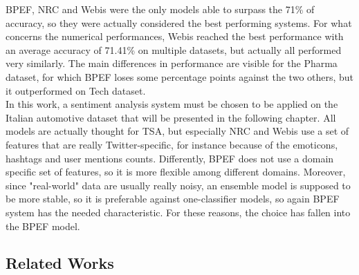 BPEF, NRC and Webis were the only models able to surpass the 71\% of accuracy, so they were actually considered the best performing systems. For what concerns the numerical performances, Webis reached the best performance with an average accuracy of 71.41\% on multiple datasets, but actually all performed very similarly. The main differences in performance are visible for the Pharma dataset, for which BPEF loses some percentage points against the two others, but it outperformed on Tech dataset.\\
In this work, a sentiment analysis system must be chosen to be applied on the Italian automotive dataset that will be presented in the following chapter. All models are actually thought for \ac{TSA}, but especially NRC and Webis use a set of features that are really Twitter-specific, for instance because of the emoticons, hashtags and user mentions counts. Differently, BPEF does not use a domain specific set of features, so it is more flexible among different domains. Moreover, since "real-world" data are usually really noisy, an ensemble model is supposed to be more stable, so it is preferable against one-classifier models, so again BPEF system has the needed characteristic. For these reasons, the choice has fallen into the BPEF model.








\subsection{Related Works}

